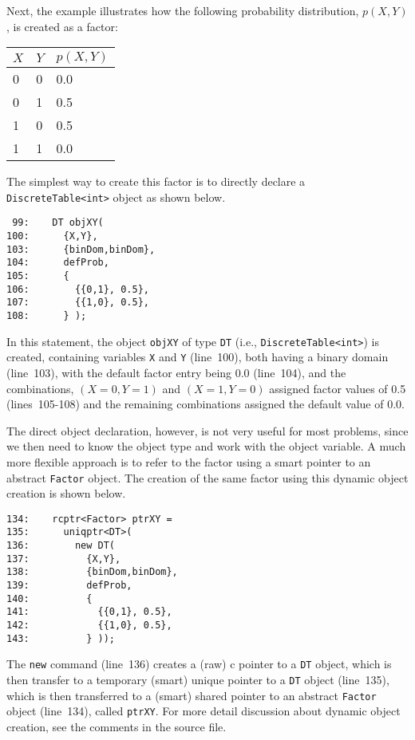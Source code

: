 \documentclass[english]{article}
\begin{document}
Next, the example illustrates how the following probability
distribution, $p(X,Y)$, is created as a factor:
\begin{center}
  \begin{tabular}{ll|l}
    $X$ & $Y$ & $p(X,Y)$ \\ \hline
    0   & 0   & 0.0 \\
    0   & 1   & 0.5 \\
    1   & 0   & 0.5 \\
    1   & 1   & 0.0
  \end{tabular}
\end{center}
The simplest way to create this factor is to directly declare a
\texttt{DiscreteTable<int>} object as shown below.
\begin{verbatim}
 99:    DT objXY(
100:      {X,Y},
103:      {binDom,binDom},
104:      defProb,
105:      {
106:        {{0,1}, 0.5},
107:        {{1,0}, 0.5},
108:      } );
\end{verbatim}
In this statement, the object \texttt{objXY} of type \texttt{DT}
(i.e., \texttt{DiscreteTable<int>}) is created, containing variables
\texttt{X} and \texttt{Y} (line~100), both having a binary domain
(line~103), with the default factor entry being 0.0 (line~104), and
the combinations, $(X=0, Y=1)$ and $(X=1, Y=0)$ assigned factor values
of 0.5 (lines~105-108) and the remaining combinations assigned the
default value of 0.0.

The direct object declaration, however, is not very useful for most
problems, since we then need to know the object type and work with the
object variable.  A much more flexible approach is to refer to the
factor using a smart pointer to an abstract \texttt{Factor} object.
The creation of the same factor using this dynamic object creation is
shown below.
\begin{verbatim}
134:    rcptr<Factor> ptrXY =
135:      uniqptr<DT>(
136:        new DT(
137:          {X,Y},
138:          {binDom,binDom},
139:          defProb,
140:          {
141:            {{0,1}, 0.5},
142:            {{1,0}, 0.5},
143:          } ));
\end{verbatim}
The \texttt{new} command (line~136) creates a (raw) c pointer to a
\texttt{DT} object, which is then transfer to a temporary (smart)
unique pointer to a \texttt{DT} object (line~135), which is then
transferred to a (smart) shared pointer to an abstract \texttt{Factor}
object (line~134), called \texttt{ptrXY}.  For more detail discussion
about dynamic object creation, see the comments in the source file.
\end{document}
